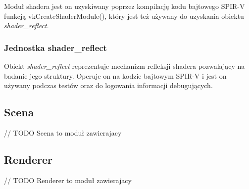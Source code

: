 Moduł shadera jest on uzyskiwany poprzez kompilację kodu bajtowego SPIR-V funkcją vkCreateShaderModule(), który jest też używany do uzyskania obiektu \textit{shader\_reflect}.

\subsubsection{Jednostka shader\_reflect}
Obiekt \textit{shader\_reflect} reprezentuje mechanizm refleksji shadera pozwalający na badanie jego struktury.
Operuje on na kodzie bajtowym SPIR-V i jest on używany podczas testów oraz do logowania informacji debugujących.

\subsection{Scena}

// TODO Scena to moduł zawierajacy 

\subsection{Renderer}

// TODO Renderer to moduł zawierajacy 


